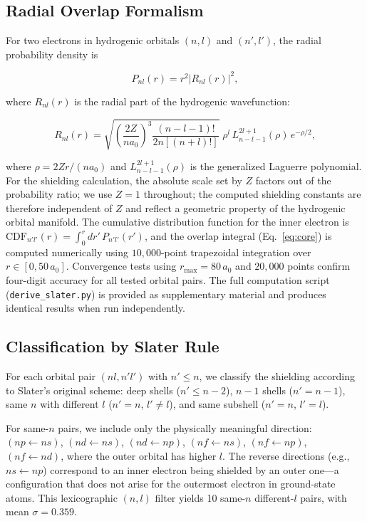 \documentclass[11pt,a4paper]{article}
\begin{document}
\subsection{Radial Overlap Formalism}

For two electrons in hydrogenic orbitals $(n,l)$ and $(n',l')$, the radial probability density is

\begin{equation}
P_{nl}(r) = r^2 |R_{nl}(r)|^2,
\end{equation}

where $R_{nl}(r)$ is the radial part of the hydrogenic wavefunction:

\begin{equation}\label{eq:radial}
R_{nl}(r) = \sqrt{\left(\frac{2Z}{n a_0}\right)^3
\frac{(n-l-1)!}{2n[(n+l)!]}} \;
\rho^l \, L_{n-l-1}^{2l+1}(\rho) \, e^{-\rho/2},
\end{equation}

where $\rho = 2Zr/(n a_0)$ and $L_{n-l-1}^{2l+1}(\rho)$ is the generalized Laguerre polynomial. For the shielding calculation, the absolute scale set by $Z$ factors out of the probability ratio; we use $Z=1$ throughout; the computed shielding constants are therefore independent of $Z$ and reflect a geometric property of the hydrogenic orbital manifold. The cumulative distribution function for the inner electron is $\mathrm{CDF}_{n'l'}(r) = \int_0^r dr'\, P_{n'l'}(r')$, and the overlap integral (Eq.~\ref{eq:core}) is computed numerically using $10{,}000$-point trapezoidal integration over $r \in [0, 50\,a_0]$. Convergence tests using $r_{\max}=80\,a_0$ and $20{,}000$ points confirm four-digit accuracy for all tested orbital pairs. The full computation script (\texttt{derive\_slater.py}) is provided as supplementary material and produces identical results when run independently.

\subsection{Classification by Slater Rule}

For each orbital pair $(nl, n'l')$ with $n' \le n$, we classify the shielding according to Slater's original scheme: deep shells ($n' \le n-2$), $n-1$ shells ($n' = n-1$), same $n$ with different $l$ ($n' = n$, $l' \neq l$), and same subshell ($n' = n$, $l' = l$).

For same-$n$ pairs, we include only the physically meaningful direction: $(np\leftarrow ns)$, $(nd\leftarrow ns)$, $(nd\leftarrow np)$, $(nf\leftarrow ns)$, $(nf\leftarrow np)$, $(nf\leftarrow nd)$, where the outer orbital has higher $l$. The reverse directions (e.g., $ns\leftarrow np$) correspond to an inner electron being shielded by an outer one---a configuration that does not arise for the outermost electron in ground-state atoms. This lexicographic $(n,l)$ filter yields 10 same-$n$ different-$l$ pairs, with mean $\sigma = 0.359$.
\end{document}
